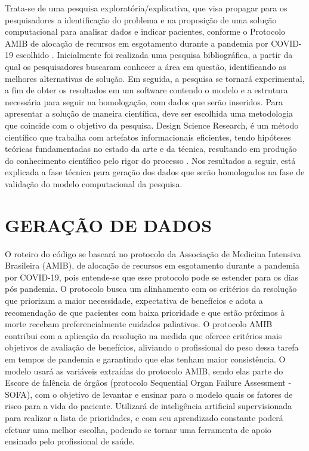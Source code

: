 \documentclass[12pt]{article}
\begin{document}
Trata-se de uma pesquisa exploratória/explicativa, que visa propagar para os pesquisadores a identificação do problema e na proposição de uma solução computacional para analisar dados e indicar pacientes, conforme o Protocolo AMIB de alocação de recursos em esgotamento durante a pandemia por COVID-19 escolhido \cite{kretzer2020protocolo}.
Inicialmente foi realizada uma pesquisa bibliográfica, a partir da qual os pesquisadores buscaram conhecer a área em questão, identificando as melhores alternativas de solução. Em seguida, a pesquisa se tornará experimental, a fim de obter os resultados em um software contendo o modelo e a estrutura necessária para seguir na homologação, com dados que serão inseridos. 
Para apresentar a solução de maneira científica, deve ser escolhida uma metodologia que coincide com o objetivo da pesquisa. Design Science Research, é um método científico que trabalha com artefatos informacionais eficientes, tendo hipóteses teóricas fundamentadas no estado da arte e da técnica, resultando em produção do conhecimento científico pelo rigor do processo \cite{pimentel2020design}.
Nos resultados a seguir, está explicada a fase técnica para geração dos dados que serão homologados na fase de validação do modelo computacional da pesquisa.


\section{GERAÇÃO DE DADOS}

O roteiro do código se baseará no protocolo da Associação de Medicina Intensiva Brasileira (AMIB), de alocação de recursos em esgotamento durante a pandemia por COVID-19, pois entende-se que esse protocolo pode se estender para os dias pós pandemia. O protocolo busca um alinhamento com os critérios da resolução que priorizam a maior necessidade, expectativa de benefícios e adota a recomendação de que pacientes com baixa prioridade e que estão próximos à morte recebam preferencialmente cuidados paliativos. O protocolo AMIB contribui com a aplicação da resolução na medida que oferece critérios mais objetivos de avaliação de benefícios, aliviando o profissional do peso dessa tarefa em tempos de pandemia e garantindo que elas tenham maior consistência.
O modelo usará as variáveis extraídas do protocolo AMIB, sendo elas parte do Escore de falência de órgãos (protocolo Sequential Organ Failure Assessment - SOFA), com o objetivo de levantar e ensinar para o modelo quais os fatores de risco para a vida do paciente.
Utilizará de inteligência artificial supervisionada para realizar a lista de prioridades, e com seu aprendizado constante poderá efetuar uma melhor escolha, podendo se tornar uma ferramenta de apoio ensinado pelo profissional de saúde.
\end{document}
